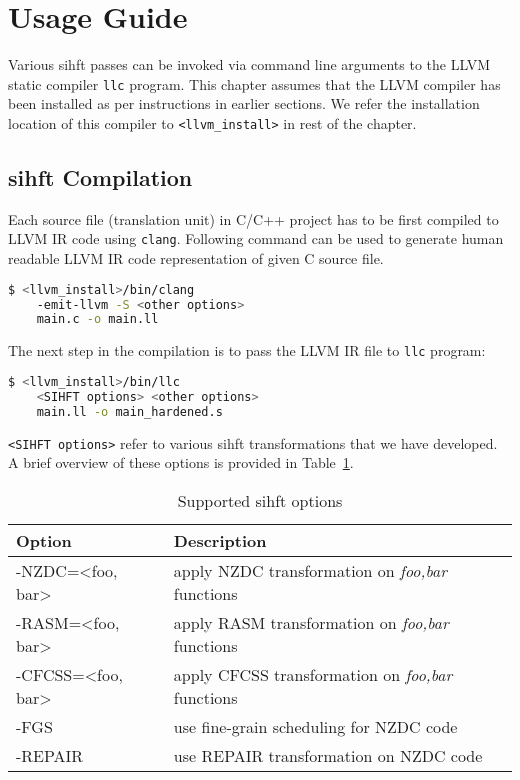 

\section{Usage Guide}

Various \ac{sihft} passes can be invoked via command line arguments to the LLVM static compiler \texttt{llc} program.
This chapter assumes that the LLVM compiler has been installed as per instructions in earlier sections.
We refer the installation location of this compiler to \texttt{<llvm\_install>} in rest of the chapter.

\subsection{\ac{sihft} Compilation}
Each source file (translation unit) in C/C++ project has to be first compiled to LLVM IR code using \texttt{clang}.
Following command can be used to generate human readable LLVM IR code representation of given C source file.
\begin{framed}
 \begin{lstlisting}[language=bash, basicstyle=\small\ttfamily]
$ <llvm_install>/bin/clang
    -emit-llvm -S <other options>
    main.c -o main.ll
  \end{lstlisting}
\end{framed}

The next step in the compilation is to pass the LLVM IR file to \texttt{llc} program:\\
\begin{lstlisting}[language=bash, basicstyle=\small\ttfamily, frame=single]
$ <llvm_install>/bin/llc
    <SIHFT options> <other options>
    main.ll -o main_hardened.s
\end{lstlisting}

\texttt{<SIHFT options>} refer to various \ac{sihft} transformations that we have developed. A brief overview of these
options is provided in Table~\ref{tab:sihft-options}.

\begin{table}[htb]
 \centering
 \caption{Supported \ac{sihft} options}
 \label{tab:sihft-options}

 \begin{tabular}{|l|l|}
  \hline
  \textbf{Option}                       & \textbf{Description}                                     \\
  \hline
  -NZDC=\textless foo, bar\textgreater  & apply NZDC transformation on \textit{foo,bar} functions  \\
  -RASM=\textless foo, bar\textgreater  & apply RASM transformation on \textit{foo,bar} functions  \\
  -CFCSS=\textless foo, bar\textgreater & apply CFCSS transformation on \textit{foo,bar} functions \\
  -FGS                                  & use fine-grain scheduling for NZDC code                  \\
  -REPAIR                               & use REPAIR transformation on NZDC code                   \\
  \hline
 \end{tabular}
\end{table}

